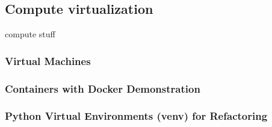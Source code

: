 \subsection{Compute virtualization}
compute stuff

\subsubsection{Virtual Machines}
\subsubsection{Containers with Docker Demonstration}
\subsubsection{Python Virtual Environments (venv) for Refactoring}
